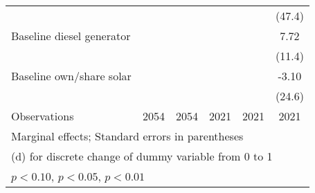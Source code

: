\begin{table}[htbp]
\begin{tabular*}{1\hsize}{@{\hskip\tabcolsep\extracolsep\fill}l*{5}{c}}
                &                  &                  &                  &                  &   (47.4)         \\
Baseline diesel generator&                  &                  &                  &                  &     7.72         \\
                &                  &                  &                  &                  &   (11.4)         \\
Baseline own/share solar&                  &                  &                  &                  &    -3.10         \\
                &                  &                  &                  &                  &   (24.6)         \\
\midrule
Observations    &     2054         &     2054         &     2021         &     2021         &     2021         \\
\bottomrule
\multicolumn{6}{l}{\footnotesize Marginal effects; Standard errors in parentheses}\\
\multicolumn{6}{l}{\footnotesize  (d) for discrete change of dummy variable from 0 to 1}\\
\multicolumn{6}{l}{\footnotesize \sym{*} \(p<0.10\), \sym{**} \(p<0.05\), \sym{***} \(p<0.01\)}\\
\end{tabular*}
\end{table}
